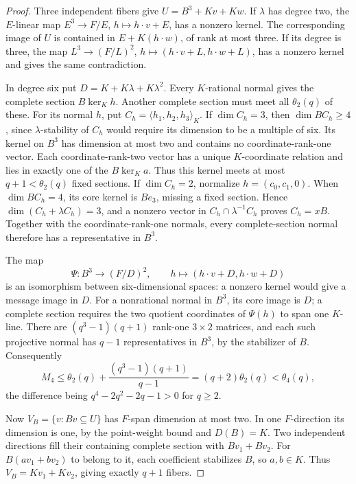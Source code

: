 \documentclass[12pt,letterpaper,onecolumn]{article}
\theoremstyle{definition}
\theoremstyle{remark}
\begin{document}
\begin{proof}
Three independent fibers give \(U=B^3+Kv+Kw\).
If \(\lambda\) has degree two, the \(E\)-linear map \(E^3\to F/E\), \(h\mapsto h\cdot v+E\), has a nonzero kernel. The corresponding image of \(U\) is contained in \(E+K(h\cdot w)\), of rank at most three.
If its degree is three, the map \(L^3\to(F/L)^2\), \(h\mapsto(h\cdot v+L,h\cdot w+L)\), has a nonzero kernel and gives the same contradiction.

In degree six put \(D=K+K\lambda+K\lambda^2\).
Every \(K\)-rational normal gives the complete section \(B\ker_Kh\).
Another complete section must meet all \(\theta_2(q)\) of these.
For its normal \(h\), put \(C_h=\langle h_1,h_2,h_3\rangle_K\).
If \(\dim C_h=3\), then \(\dim BC_h\ge4\), since \(\lambda\)-stability of \(C_h\) would require its dimension to be a multiple of six.
Its kernel on \(B^3\) has dimension at most two and contains no coordinate-rank-one vector.
Each coordinate-rank-two vector has a unique \(K\)-coordinate relation and lies in exactly one of the \(B\ker_Ka\).
Thus this kernel meets at most \(q+1<\theta_2(q)\) fixed sections.
If \(\dim C_h=2\), normalize \(h=(c_0,c_1,0)\).
When \(\dim BC_h=4\), its core kernel is \(Be_3\), missing a fixed section.
Hence \(\dim(C_h+\lambda C_h)=3\), and a nonzero vector in \(C_h\cap\lambda^{-1}C_h\) proves \(C_h=xB\).
Together with the coordinate-rank-one normals, every complete-section normal therefore has a representative in \(B^3\).

The map
\[
\Psi:B^3\longrightarrow(F/D)^2,\qquad
h\longmapsto(h\cdot v+D,h\cdot w+D)
\]
is an isomorphism between six-dimensional spaces: a nonzero kernel would give a message image in \(D\).
For a nonrational normal in \(B^3\), its core image is \(D\); a complete section requires the two quotient coordinates of \(\Psi(h)\) to span one \(K\)-line.
There are \((q^3-1)(q+1)\) rank-one \(3\times2\) matrices, and each such projective normal has \(q-1\) representatives in \(B^3\), by the stabilizer of \(B\).
Consequently
\[
M_4\le\theta_2(q)+\frac{(q^3-1)(q+1)}{q-1}
=(q+2)\theta_2(q)<\theta_4(q),
\]
the difference being \(q^4-2q^2-2q-1>0\) for \(q\ge2\).

Now \(V_B=\{v:Bv\subseteq U\}\) has \(F\)-span dimension at most two.
In one \(F\)-direction its dimension is one, by the point-weight bound and \(D(B)=K\).
Two independent directions fill their containing complete section with \(Bv_1+Bv_2\).
For \(B(av_1+bv_2)\) to belong to it, each coefficient stabilizes \(B\), so \(a,b\in K\).
Thus \(V_B=Kv_1+Kv_2\), giving exactly \(q+1\) fibers.
\end{proof}
\end{document}
